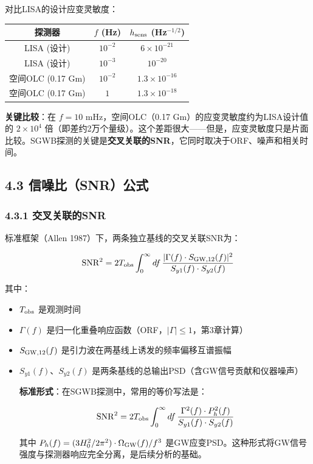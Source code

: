 \documentclass[12pt,a4paper]{article}
\begin{document}
对比LISA的设计应变灵敏度：

\begin{tabular}{|c|c|c|}
\hline
探测器 & $f$ (Hz) & $h_{\rm sens}$ (Hz$^{-1/2}$) \\
\hline
LISA (设计) & $10^{-2}$ & $6 \times 10^{-21}$ \\
LISA (设计) & $10^{-3}$ & $10^{-20}$ \\
空间OLC (0.17 Gm) & $10^{-2}$ & $1.3 \times 10^{-16}$ \\
空间OLC (0.17 Gm) & $1$ & $1.3 \times 10^{-18}$ \\
\hline
\end{tabular}


\textbf{关键比较}：在 $f = 10$ mHz，空间OLC（0.17 Gm）的应变灵敏度约为LISA设计值的 $2 \times 10^4$ 倍（即差约2万个量级）。这个差距很大——但是，应变灵敏度只是片面比较。SGWB探测的关键是\textbf{交叉关联的SNR}，它同时取决于ORF、噪声和相关时间。

\subsection{4.3 信噪比（SNR）公式}


\subsubsection{4.3.1 交叉关联的SNR}


标准框架（Allen 1987）下，两条独立基线的交叉关联SNR为：

$${\rm SNR}^2 = 2 T_{\rm obs} \int_0^\infty df\, \frac{|\Gamma(f) \cdot S_{{\rm GW},12}(f)|^2}{S_{y1}(f) \cdot S_{y2}(f)}$$

其中：
\begin{itemize}
  \item $T_{\rm obs}$ 是观测时间
  \item $\Gamma(f)$ 是归一化重叠响应函数（ORF，$|\Gamma| \leq 1$，第3章计算）
  \item $S_{{\rm GW},12}(f)$ 是引力波在两基线上诱发的频率偏移互谱振幅
  \item $S_{y1}(f)$、$S_{y2}(f)$ 是两条基线的总输出PSD（含GW信号贡献和仪器噪声）

\textbf{标准形式}：在SGWB探测中，常用的等价写法是：

$${\rm SNR}^2 = 2 T_{\rm obs} \int_0^\infty df\, \frac{\Gamma^2(f) \cdot P_h^2(f)}{S_{y1}(f) \cdot S_{y2}(f)}$$

其中 $P_h(f) = (3H_0^2/2\pi^2) \cdot \Omega_{\rm GW}(f)/f^3$ 是GW应变PSD。这种形式将GW信号强度与探测器响应完全分离，是后续分析的基础。

\end{itemize}
\end{document}
